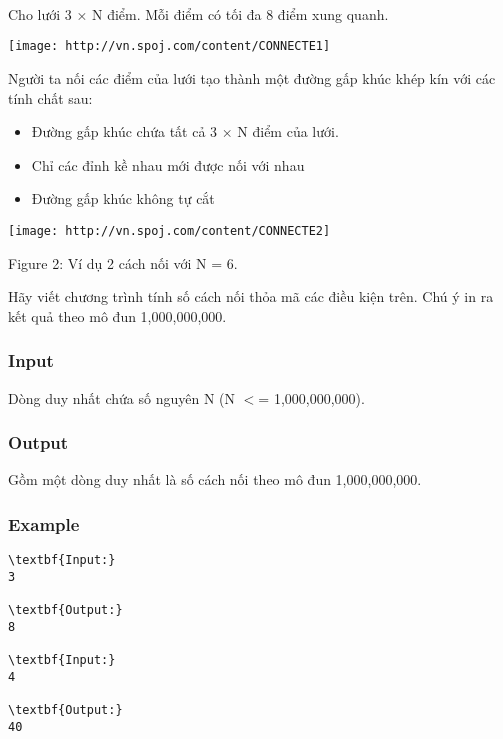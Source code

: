 

 

 

 

Cho lưới 3 × N điểm. Mỗi điểm có tối đa 8 điểm xung quanh.


\texttt{[image: http://vn.spoj.com/content/CONNECTE1]}

Người ta nối các điểm của lưới tạo thành một đường gấp khúc khép kín với các tính chất sau:
\begin{itemize}
	\item Đường gấp khúc chứa tất cả 3 × N điểm của lưới.
	\item Chỉ các đỉnh kề nhau mới được nối với nhau
	\item Đường gấp khúc không tự cắt
\end{itemize}


\texttt{[image: http://vn.spoj.com/content/CONNECTE2]}

Figure 2: Ví dụ 2 cách nối với N = 6.

Hãy viết chương trình tính số cách nối thỏa mã các điều kiện trên. Chú ý in ra kết quả theo mô đun 1,000,000,000.

\subsubsection{Input}

Dòng duy nhất chứa số nguyên N (N $<$= 1,000,000,000).

\subsubsection{Output}

Gồm một dòng duy nhất là số cách nối theo mô đun 1,000,000,000.

\subsubsection{Example}
\begin{verbatim}
\textbf{Input:}
3

\textbf{Output:}
8

\textbf{Input:}
4

\textbf{Output:}
40\end{verbatim}

 